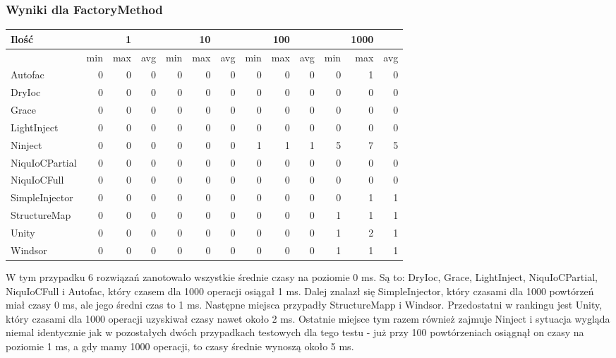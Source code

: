 \documentclass[12pt]{article}
\begin{document}
\subsubsection{Wyniki dla FactoryMethod}
\begin{center}
\begin{small}
	\begin{tabular}{ | l | r r r | r r r | r r r | r r r | }
    		\hline
Ilość & & 1 & & & 10 & & & 100 & & & 1000 & \\ \hline
 & min & max & avg & min & max & avg & min & max & avg & min & max & avg \\ \hline
Autofac & 0 & 0 & 0 & 0 & 0 & 0 & 0 & 0 & 0 & 0 & 1 & 0 \\ \hline
DryIoc & 0 & 0 & 0 & 0 & 0 & 0 & 0 & 0 & 0 & 0 & 0 & 0 \\ \hline
Grace & 0 & 0 & 0 & 0 & 0 & 0 & 0 & 0 & 0 & 0 & 0 & 0 \\ \hline
LightInject & 0 & 0 & 0 & 0 & 0 & 0 & 0 & 0 & 0 & 0 & 0 & 0 \\ \hline
Ninject & 0 & 0 & 0 & 0 & 0 & 0 & 1 & 1 & 1 & 5 & 7 & 5 \\ \hline
NiquIoCPartial & 0 & 0 & 0 & 0 & 0 & 0 & 0 & 0 & 0 & 0 & 0 & 0 \\ \hline
NiquIoCFull & 0 & 0 & 0 & 0 & 0 & 0 & 0 & 0 & 0 & 0 & 0 & 0 \\ \hline
SimpleInjector & 0 & 0 & 0 & 0 & 0 & 0 & 0 & 0 & 0 & 0 & 1 & 1 \\ \hline
StructureMap & 0 & 0 & 0 & 0 & 0 & 0 & 0 & 0 & 0 & 1 & 1 & 1 \\ \hline
Unity & 0 & 0 & 0 & 0 & 0 & 0 & 0 & 0 & 0 & 1 & 2 & 1 \\ \hline
Windsor & 0 & 0 & 0 & 0 & 0 & 0 & 0 & 0 & 0 & 1 & 1 & 1 \\ \hline
  	\end{tabular}
\end{small}
\end{center}
W tym przypadku 6 rozwiązań zanotowało wszystkie średnie czasy na poziomie 0 ms. Są to: DryIoc, Grace, LightInject, NiquIoCPartial, NiquIoCFull i Autofac, który czasem dla 1000 operacji osiągał 1 ms. Dalej znalazł się SimpleInjector, który czasami dla 1000 powtórzeń miał czasy 0 ms, ale jego średni czas to 1 ms. Następne miejsca przypadły StructureMapp i Windsor. Przedostatni w rankingu jest Unity, który czasami dla 1000 operacji uzyskiwał czasy nawet około 2 ms. Ostatnie miejsce tym razem również zajmuje Ninject i sytuacja wygląda niemal identycznie jak w pozostałych dwóch przypadkach testowych dla tego testu - już przy 100 powtórzeniach osiągnął on czasy na poziomie 1 ms, a gdy mamy 1000 operacji, to czasy średnie wynoszą około 5 ms.
\end{document}
